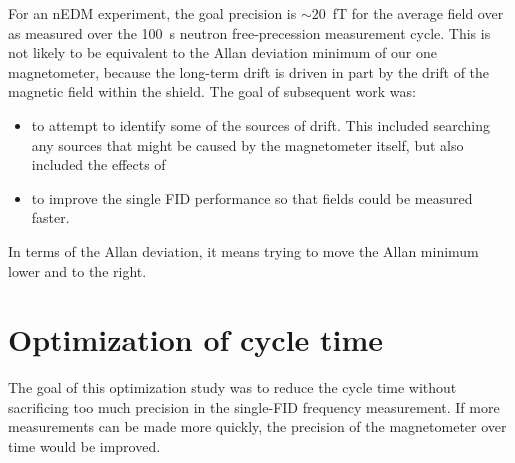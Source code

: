 For an nEDM experiment, the goal precision is $\sim 20$~fT for the
average field over as measured over the 100~s neutron free-precession
measurement cycle.  This is not likely to be equivalent to the Allan
deviation minimum of our one magnetometer, because the long-term drift
is driven in part by the drift of the magnetic field within the
shield.  The goal of subsequent work was:
\begin{itemize}
\item to attempt to identify some of the sources of drift.  This
  included searching any sources that might be caused by the
  magnetometer itself, but also included the effects of
\item to improve the single FID performance so that fields could be
  measured faster.
\end{itemize}
In terms of the Allan deviation, it means trying to move the Allan
minimum lower and to the right.

\section{Optimization of cycle time} 

The goal of this optimization study was to reduce the cycle time
without sacrificing too much precision in the single-FID frequency
measurement.  If more measurements can be made more quickly, the
precision of the magnetometer over time would be improved.

